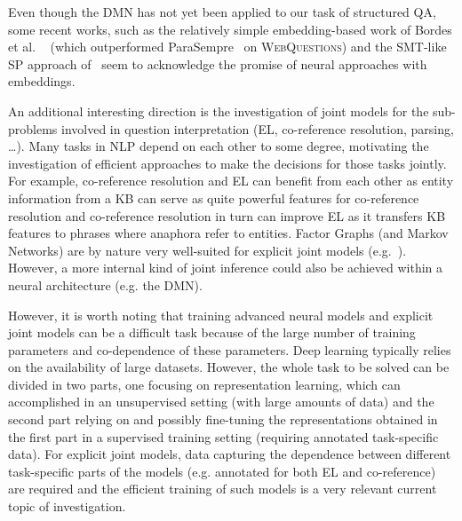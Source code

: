 Even though the DMN has not yet been applied to our task of structured QA, some recent works, such as the relatively simple embedding-based work of Bordes et al. ~\cite{bordes2014question} (which outperformed ParaSempre~\cite{parasempre} on \textsc{WebQuestions}) and the SMT-like SP approach of~\cite{dong2016language} seem to acknowledge the promise of neural approaches with embeddings.

An additional interesting direction is the investigation of joint models for the sub-problems involved in question interpretation (EL, co-reference resolution, parsing, \dots).
Many tasks in NLP depend on each other to some degree, motivating the investigation of efficient approaches to make the decisions for those tasks jointly.
For example, co-reference resolution and EL can benefit from each other as entity information from a KB can serve as quite powerful features for co-reference resolution and co-reference resolution in turn can improve EL as it transfers KB features to phrases where anaphora refer to entities.
Factor Graphs (and Markov Networks) are by nature very well-suited for explicit joint models (e.g.~\cite{jointriedel}).
However, a more internal kind of joint inference could also be achieved within a neural architecture (e.g. the DMN).%

However, it is worth noting that training advanced neural models and explicit joint models can be a difficult task because of the large number of training parameters and co-dependence of these parameters. Deep learning typically relies on the availability of large datasets. However, the whole task to be solved can be divided in two parts, one focusing on representation learning, which can accomplished in an unsupervised setting (with large amounts of data) and the second part relying on and possibly fine-tuning the representations obtained in the first part in a supervised training setting (requiring annotated task-specific data). For explicit joint models, data capturing the dependence between different task-specific parts of the models (e.g. annotated for both EL and co-reference) are required and the efficient training of such models is a very relevant current topic of investigation.

